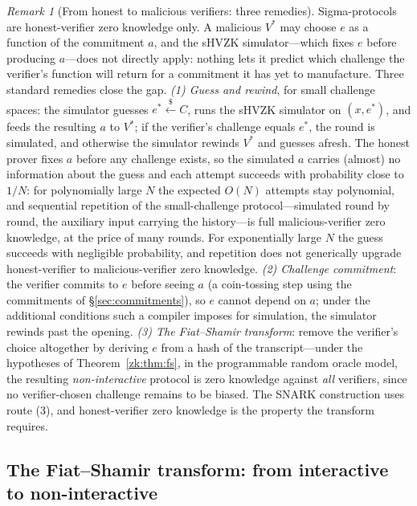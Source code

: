 \documentclass[11pt,a4paper]{article}
\theoremstyle{definition}
\theoremstyle{remark}
\newtheorem{remark}[theorem]{Remark}
\begin{document}
\begin{remark}[From honest to malicious verifiers: three remedies]
\label{zk:rem:malicious}
Sigma-protocols are honest-verifier zero knowledge only. A malicious
\(V^{*}\) may choose \(e\) as a function of the commitment \(a\),
and the sHVZK simulator---which fixes \(e\) before producing
\(a\)---does not directly apply: nothing lets it predict which
challenge the verifier's function will return for a commitment it
has yet to manufacture. Three standard remedies close the gap.
\emph{(1) Guess and rewind}, for small challenge spaces: the
simulator guesses \(e^{*} \xleftarrow{\$} C\), runs the sHVZK
simulator on \((x, e^{*})\), and feeds the resulting \(a\) to
\(V^{*}\); if the verifier's challenge equals \(e^{*}\), the round
is simulated, and otherwise the simulator rewinds \(V^{*}\) and
guesses afresh. The honest prover fixes \(a\) before any challenge
exists, so the simulated \(a\) carries (almost) no information
about the guess and each attempt succeeds with probability close
to \(1/N\): for polynomially large \(N\) the expected \(O(N)\)
attempts stay polynomial, and sequential repetition of the
small-challenge protocol---simulated round by round, the
auxiliary input carrying the history---is full malicious-verifier
zero knowledge, at the price of many rounds. For exponentially
large \(N\) the guess succeeds with negligible probability, and
repetition does not
generically upgrade honest-verifier to malicious-verifier zero
knowledge. \emph{(2) Challenge commitment}: the verifier commits to
\(e\) before seeing \(a\) (a coin-tossing step using the
commitments of \S\ref{sec:commitments}), so \(e\) cannot depend on
\(a\); under the additional conditions such a compiler imposes for
simulation, the simulator rewinds past the opening. \emph{(3) The
Fiat--Shamir transform}: remove the verifier's choice altogether by
deriving \(e\) from a hash of the transcript---under the hypotheses
of Theorem~\ref{zk:thm:fs}, in the programmable random oracle
model, the resulting \emph{non-interactive} protocol is zero
knowledge against \emph{all} verifiers, since no verifier-chosen
challenge remains to be biased. The SNARK construction uses route
(3), and honest-verifier zero knowledge is the property the transform
requires.
\end{remark}

\subsection{The Fiat--Shamir transform: from interactive to
non-interactive}\label{zk:subsec:fiatshamir}
\end{document}

